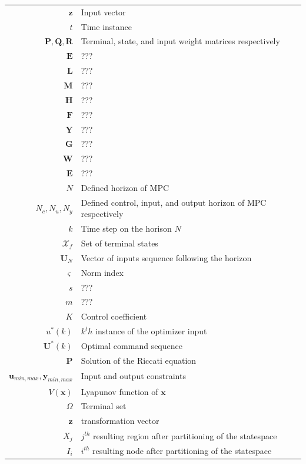 \begin{tabularx}{\textwidth}{r|l}
	$\textbf{z}$											& Input vector\\
	$t$																& Time instance\\
	$\textbf{P}, \textbf{Q},\textbf{R}$ & Terminal, state, and input weight matrices respectively\\
	$\textbf{E}$																&???\\
	$\textbf{L}$																&???\\
	$\textbf{M}$																&???\\
	$\textbf{H}$																&???\\
	$\textbf{F}$																&???\\
	$\textbf{Y}$																&???\\
	$\textbf{G}$																&???\\
	$\textbf{W}$																&???\\
	$\textbf{E}$																&???\\
	$N$											& Defined horizon of MPC\\
	$N_c,N_u,N_y$											& Defined control, input, and output horizon of MPC respectively\\
	$k$																& Time step on the horison $N$ \\
	$\mathcal{X}_f$															& Set of terminal states \\
	$\textbf{U}_N$										& Vector of inputs sequence following the horizon\\
	$\varsigma$											& Norm index\\
	$s$																& ???\\
	$m$																& ???\\
	$K$															& Control coefficient \\
	$u^*(k)$													& $k^th$ instance of the optimizer input\\
	$\textbf{U}^*(k)$									& Optimal command sequence\\
	$\textbf{P}$																& Solution of the Riccati equation\\
	$\textbf{u}_{min,max},\textbf{y}_{min,max}$					& Input and output constraints\\
	$V(\textbf{x})$														& Lyapunov function of $\textbf{x}$\\
	$\Omega$ 													& Terminal set\\
	$\textbf{z}$																& transformation vector\\
	$X_j$															& $j^{th}$ resulting region after partitioning of the statespace\\
	$I_i$															& $i^{th}$ resulting node after partitioning of the statespace\\
	
\end{tabularx}

%

